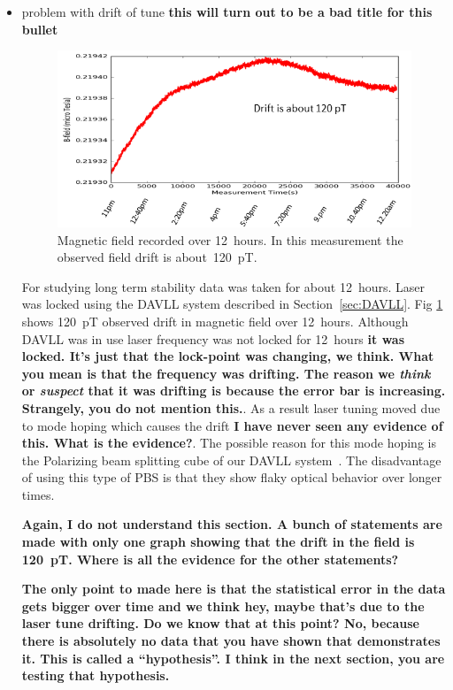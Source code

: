 \begin{itemize}
\item problem with drift of tune {\bf this will turn out to be a bad
  title for this bullet}\\
  \begin{figure}%
    \centering\includegraphics[width=0.6\linewidth]{figures/field_drift}
    \caption{Magnetic field recorded over 12~hours.  In this
      measurement the observed field drift is
      about~120~pT.\label{fig:digilock-drift}}
  \end{figure}
  For studying long term stability data was taken for about
  12~hours. Laser was locked using the DAVLL system described in
  Section~\ref{sec:DAVLL}. Fig \ref{fig:digilock-drift} shows 120~pT
  observed drift in magnetic field over 12~hours. Although DAVLL was
  in use laser frequency was not locked for 12~hours {\bf it was
    locked.  It's just that the lock-point was changing, we think.
    What you mean is that the frequency was drifting.  The reason we
    {\it think} or {\it suspect} that it was drifting is because the
    error bar is increasing.  Strangely, you do not mention this.}. As
  a result laser tuning moved due to mode hoping which causes the
  drift {\bf I have never seen any evidence of this.  What is the
    evidence?}. The
  possible reason for this mode hoping is the Polarizing beam
  splitting cube of our DAVLL system~\cite{principles}. The
  disadvantage of using this type of PBS is that they show flaky
  optical behavior over longer times\cite{bib:Philip2008}.

  {\bf Again, I do not understand this section.  A bunch of statements
    are made with only one graph showing that the drift in the field
    is 120~pT.  Where is all the evidence for the other statements?}

  {\bf The only point to made here is that the statistical error in
    the data gets bigger over time and we think hey, maybe that's due
    to the laser tune drifting.  Do we know that at this point?  No,
    because there is absolutely no data that you have shown that
    demonstrates it.  This is called a ``hypothesis''.  I think in the
    next section, you are testing that hypothesis.}


\end{itemize}
